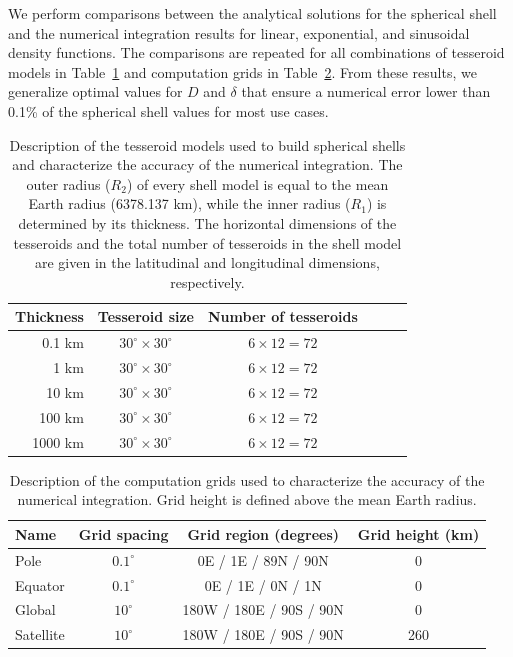 \documentclass[extra, referee]{gji}
\begin{document}
We perform comparisons between the analytical solutions for the spherical shell and the
numerical integration results for linear, exponential, and sinusoidal density
functions.
The comparisons are repeated for all combinations of tesseroid models in
Table~\ref{tab:shell-models} and computation grids in Table~\ref{tab:grids}.
From these results, we generalize optimal values for $D$ and $\delta$ that ensure a
numerical error lower than 0.1\% of the spherical shell values for most use cases.

\begin{table}
\caption{
    Description of the tesseroid models used to build spherical shells and characterize
    the accuracy of the numerical integration.
    The outer radius ($R_2$) of every shell model is equal to the mean Earth radius
    (6378.137 km), while the inner radius ($R_1$) is determined by its thickness.
    The horizontal dimensions of the tesseroids and the total number of
    tesseroids in the shell model are given in the latitudinal and longitudinal
    dimensions, respectively.
}
\label{tab:shell-models}
\begin{tabular}{rccccc}
    Thickness & Tesseroid size & Number of tesseroids \\ \hline
    0.1 km  & $30^\circ \times 30^\circ$ & $6 \times 12 = 72$ \\
    1 km    & $30^\circ \times 30^\circ$ & $6 \times 12 = 72$ \\
    10 km   & $30^\circ \times 30^\circ$ & $6 \times 12 = 72$ \\
    100 km  & $30^\circ \times 30^\circ$ & $6 \times 12 = 72$ \\
    1000 km & $30^\circ \times 30^\circ$ & $6 \times 12 = 72$ \\
\end{tabular}
\end{table}

\begin{table}
\caption{
    Description of the computation grids used to characterize the accuracy of the
    numerical integration.
    Grid height is defined above the mean Earth radius.
}
\label{tab:grids}
\begin{tabular}{lccc}
    Name & Grid spacing & Grid region (degrees) & Grid height (km)
    \\ \hline
    Pole      & $0.1^\circ$ &   0E /   1E / 89N / 90N & 0   \\
    Equator   & $0.1^\circ$ &   0E /   1E /  0N / 1N  & 0   \\
    Global    & $ 10^\circ$ & 180W / 180E / 90S / 90N & 0   \\
    Satellite & $ 10^\circ$ & 180W / 180E / 90S / 90N & 260 \\
\end{tabular}
\end{table}
\end{document}

